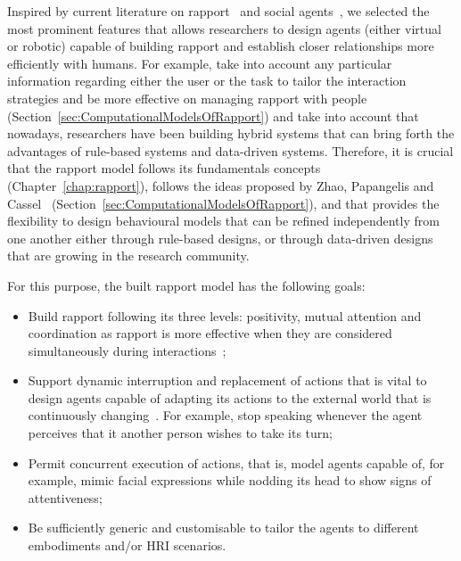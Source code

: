 \label{chap:rapportModel}

Inspired by current literature on rapport~\cite{Buschmeier2011, Spencer-Oatey2005, Zhao2014, Papangelis2014} and social agents~\cite{Zwiers2011, Reidsma2011, Riek2009, Niewiadomski2009, Andrist2014, Andrist2015, Cassell2007, Wang2009, Schroder2010, Buschmeier2011, Tullio2015}, we selected the most prominent features that allows researchers to design agents (either virtual or robotic) capable of building rapport and establish closer relationships more efficiently with humans. For example, take into account any particular information regarding either the user or the task to tailor the interaction strategies and be more effective on managing rapport with people (Section~\ref{sec:ComputationalModelsOfRapport}) and take into account that nowadays, researchers have been building hybrid systems that can bring forth the advantages of rule-based systems and data-driven systems. Therefore, it is crucial that the rapport model follows its fundamentals concepts (Chapter~\ref{chap:rapport}), follows the ideas proposed by Zhao, Papangelis and Cassel~\cite{Zhao2014, Papangelis2014} (Section~\ref{sec:ComputationalModelsOfRapport}), and that provides the flexibility to design behavioural models that can be refined independently from one another either through rule-based designs, or through data-driven designs that are growing in the research community.

For this purpose, the built rapport model has the following goals:

\begin{itemize}
    \item Build rapport following its three levels: positivity, mutual attention and coordination as rapport is more effective when they are considered simultaneously during interactions~\cite{Buschmeier2011, Spencer-Oatey2005, Zhao2014, Papangelis2014};
    \item Support dynamic interruption and replacement of actions that is vital to design agents capable of adapting its actions to the external world that is continuously changing~\cite{Reidsma2011, Visser2014, Kopp2007, Zwiers2011}. For example, stop speaking whenever the agent perceives that it another person wishes to take its turn;
    \item Permit concurrent execution of actions, that is, model agents capable of, for example, mimic facial expressions while nodding its head to show signs of attentiveness;
    \item Be sufficiently generic and customisable to tailor the agents to different embodiments and/or \ac{HRI} scenarios.
\end{itemize}

